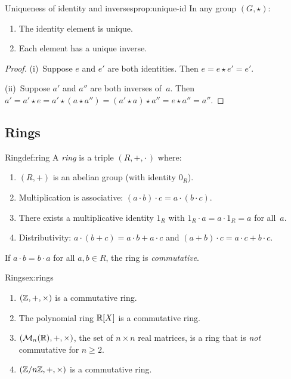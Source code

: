 \begin{proposition}{Uniqueness of identity and inverses}{prop:unique-id}
In any group $(G,\star)$:
\begin{enumerate}[label=(\roman*)]
  \item The identity element is unique.
  \item Each element has a unique inverse.
\end{enumerate}
\end{proposition}

\begin{proof}
(i)~Suppose $e$ and $e'$ are both identities. Then $e = e\star e' = e'$.

(ii)~Suppose $a'$ and $a''$ are both inverses of~$a$. Then
$a' = a'\star e = a'\star(a\star a'') = (a'\star a)\star a'' = e\star a'' = a''$.
\end{proof}

\subsection{Rings}\label{subsec:rings}

\begin{definition}{Ring}{def:ring}
A \emph{ring} is a triple $(R,+,\cdot\,)$ where:
\begin{enumerate}[label=\textbf{R\arabic*.}]
  \item $(R,+)$ is an abelian group (with identity $0_R$).
  \item Multiplication is associative:
    $(a\cdot b)\cdot c = a\cdot(b\cdot c)$.
  \item There exists a multiplicative identity $1_R$ with
    $1_R\cdot a = a\cdot 1_R = a$ for all~$a$.
  \item Distributivity:
    $a\cdot(b+c) = a\cdot b + a\cdot c$ and
    $(a+b)\cdot c = a\cdot c + b\cdot c$.
\end{enumerate}
If $a\cdot b = b\cdot a$ for all $a,b\in R$, the ring is
\emph{commutative}.
\end{definition}

\begin{example}{Rings}{ex:rings}
\begin{enumerate}[label=(\alph*)]
  \item $({\mathbb{Z}},+,\times)$ is a commutative ring.
  \item The polynomial ring ${\mathbb{R}}[X]$ is a commutative ring.
  \item $(\mathcal{M}_n({\mathbb{R}}),+,\times)$, the set of $n\times n$ real matrices, is
    a ring that is \emph{not} commutative for $n\geq 2$.
  \item $({\mathbb{Z}}/n{\mathbb{Z}},+,\times)$ is a commutative ring.
\end{enumerate}
\end{example}

